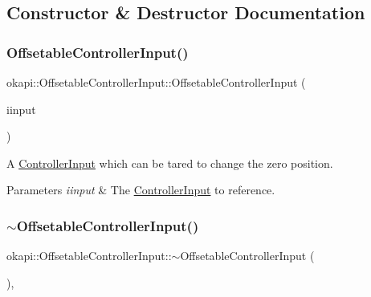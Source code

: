 \subsection{Constructor \& Destructor Documentation}
\mbox{\label{classokapi_1_1OffsetableControllerInput_ac29065910ac48f3020638164812088e0}} 
\subsubsection{\texorpdfstring{OffsetableControllerInput()}{OffsetableControllerInput()}}
{\footnotesize\ttfamily okapi\+::\+Offsetable\+Controller\+Input\+::\+Offsetable\+Controller\+Input (\begin{DoxyParamCaption}\item[{const std\+::shared\+\_\+ptr$<$ \mbox{\hyperlink{classokapi_1_1ControllerInput}{Controller\+Input}}$<$ double $>$$>$ \&}]{iinput }\end{DoxyParamCaption})\hspace{0.3cm}{\ttfamily [explicit]}}

A \mbox{\hyperlink{classokapi_1_1ControllerInput}{Controller\+Input}} which can be tared to change the zero position.


\begin{DoxyParams}{Parameters}
{\em iinput} & The \mbox{\hyperlink{classokapi_1_1ControllerInput}{Controller\+Input}} to reference. \\
\hline
\end{DoxyParams}
\mbox{\label{classokapi_1_1OffsetableControllerInput_aaad20a6602e68e223ef6d31ef7597a65}} 
\subsubsection{\texorpdfstring{$\sim$OffsetableControllerInput()}{~OffsetableControllerInput()}}
{\footnotesize\ttfamily okapi\+::\+Offsetable\+Controller\+Input\+::$\sim$\+Offsetable\+Controller\+Input (\begin{DoxyParamCaption}{ }\end{DoxyParamCaption})\hspace{0.3cm}{\ttfamily [virtual]}, {\ttfamily [default]}}



